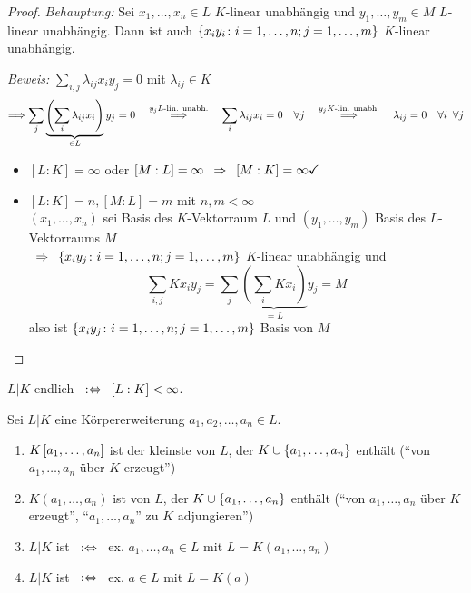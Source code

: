 \begin{proof}
    \textit{Behauptung:} Sei $x_1, \dots, x_n \in L$ $K$-linear unabhängig und $y_1, \dots, y_m \in M$ $L$-linear unabhängig. Dann ist auch $\left\{ x_i y_i \colon i = 1, \dots , n ; j = 1, \dots, m \right\}$ $K$-linear unabhängig.
    
    \textit{Beweis:} $\sum_{i,j} \lambda_{ij}x_i y_j = 0$ mit $\lambda_{ij} \in K$
    \begin{equation*}
        \Longrightarrow \sum_{j}\underbrace{\left( \sum_{i} \lambda_{ij}x_i \right)}_{\in L} y_j = 0 
        \quad \overset{y_j L\text{-lin. unabh.}}{\Longrightarrow} \quad \sum_{i} \lambda_{ij} x_i = 0 \quad \forall j
        \quad \overset{y_j K\text{-lin. unabh.}}{\Longrightarrow} \quad \lambda_{ij} = 0 \quad \forall i \enskip \forall j
    \end{equation*}
    
    \begin{itemize}[nolistsep, leftmargin=*]
        \item $[L:K] = \infty$ oder $[M:L] = \infty \enskip \Rightarrow \enskip [M:K] = \infty \checkmark$
        \item $[L:K] = n, [M:L] = m$ mit $n,m < \infty$ \\
        $(x_1, \dots, x_n)$ sei Basis des $K$-Vektorraum $L$ und $(y_1, \dots, y_m)$ Basis des $L$-Vektorraums $M$\\
        $\enskip \Rightarrow \enskip \left\{ x_i y_j \colon i = 1, \dots, n; j = 1, \dots, m \right\}$ $K$-linear unabhängig und
        \begin{equation*}
            \sum_{i,j} K x_i y_j = \sum_{j} \underbrace{\left( \sum_{i} K x_i \right)}_{=L} y_j = M
        \end{equation*}
        also ist $\left\{ x_i y_j \colon i = 1, \dots ,n ; j = 1, \dots, m \right\}$ Basis von $M$ 
    \end{itemize}
\end{proof}

\begin{definition}
    $L | K$ endlich $\enskip \mathrel{:\Leftrightarrow} \enskip [L:K] < \infty$.
\end{definition}

\begin{definition}
    Sei $L | K$ eine Körpererweiterung $a_1, a_2, \dots, a_n \in L$.
    \begin{enumerate}[leftmargin=*]
        \item $\polynom[K][a_1, \dots , a_n]$ ist der kleinste  von $L$, der $K \cup \left\{ a_1, \dots, a_n \right\}$ enthält (``von $a_1, \dots, a_n$ über $K$ erzeugt'')
        \item $K(a_1, \dots, a_n)$ ist  von $L$, der $K \cup \left\{ a_1, \dots, a_n \right\}$ enthält (``von $a_1, \dots, a_n$ über $K$ erzeugt'', ``$a_1, \dots, a_n$'' zu $K$ adjungieren'')
        \item $L | K$ ist  $\enskip \mathrel{:\Leftrightarrow} \enskip$ ex. $a_1, \dots , a_n \in L$ mit $L=K(a_1, \dots, a_n)$
        \item $L | K$ ist  $\enskip \mathrel{:\Leftrightarrow} \enskip$ ex. $a \in L$ mit $L=K(a)$
    \end{enumerate}
\end{definition}

